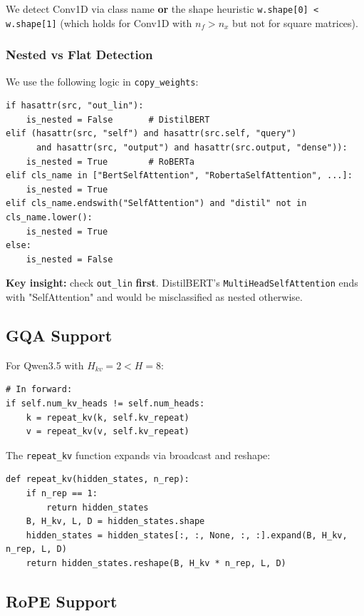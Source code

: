 We detect Conv1D via class name \textbf{or} the shape heuristic 
\texttt{w.shape[0] < w.shape[1]} (which holds for Conv1D with $n_f > n_x$ but 
not for square matrices).

\subsubsection{Nested vs Flat Detection}

We use the following logic in \texttt{copy\_weights}:

\begin{lstlisting}
if hasattr(src, "out_lin"):
    is_nested = False       # DistilBERT
elif (hasattr(src, "self") and hasattr(src.self, "query")
      and hasattr(src, "output") and hasattr(src.output, "dense")):
    is_nested = True        # RoBERTa
elif cls_name in ["BertSelfAttention", "RobertaSelfAttention", ...]:
    is_nested = True
elif cls_name.endswith("SelfAttention") and "distil" not in cls_name.lower():
    is_nested = True
else:
    is_nested = False
\end{lstlisting}

\textbf{Key insight:} check \texttt{out\_lin} \textbf{first}. DistilBERT's 
\texttt{MultiHeadSelfAttention} ends with "SelfAttention" and would be misclassified 
as nested otherwise.

\subsection{GQA Support}

For Qwen3.5 with $H_{kv} = 2 < H = 8$:

\begin{lstlisting}
# In forward:
if self.num_kv_heads != self.num_heads:
    k = repeat_kv(k, self.kv_repeat)
    v = repeat_kv(v, self.kv_repeat)
\end{lstlisting}

The \texttt{repeat\_kv} function expands via broadcast and reshape:

\begin{lstlisting}
def repeat_kv(hidden_states, n_rep):
    if n_rep == 1:
        return hidden_states
    B, H_kv, L, D = hidden_states.shape
    hidden_states = hidden_states[:, :, None, :, :].expand(B, H_kv, n_rep, L, D)
    return hidden_states.reshape(B, H_kv * n_rep, L, D)
\end{lstlisting}

\subsection{RoPE Support}

